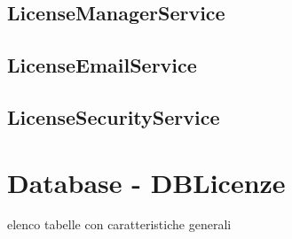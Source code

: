 \subsection{LicenseManagerService}

\subsection{LicenseEmailService}

\subsection{LicenseSecurityService}


\section{Database - DBLicenze}
\label{sez:DBLic}
elenco tabelle con caratteristiche generali

